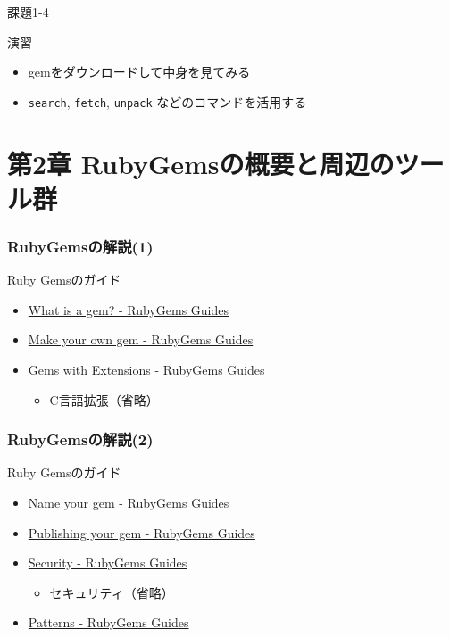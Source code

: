 \documentclass[t, aspectratio=169]{beamer}
\begin{document}
\begin{frame}[fragile,label=sec-1-5-4]{課題1-4}
 \begin{block}{演習}
\begin{itemize}
\item gemをダウンロードして中身を見てみる
\item \texttt{search}, \texttt{fetch},  \texttt{unpack} などのコマンドを活用する
\end{itemize}
\end{block}
\end{frame}

\part{第2章 RubyGemsの概要と周辺のツール群}
\label{sec-2}
\section{RubyGemsの解説(1)}
\label{sec-2-1}
\begin{frame}[label=sec-2-1-1]{Ruby Gemsのガイド}
\begin{itemize}
\item \href{http://guides.rubygems.org/what-is-a-gem/}{What is a gem? - RubyGems Guides}
\item \href{http://guides.rubygems.org/make-your-own-gem/}{Make your own gem - RubyGems Guides}
\item \href{http://guides.rubygems.org/gems-with-extensions/}{Gems with Extensions - RubyGems Guides}
\begin{itemize}
\item C言語拡張（省略）
\end{itemize}
\end{itemize}
\end{frame}

\section{RubyGemsの解説(2)}
\label{sec-2-2}
\begin{frame}[label=sec-2-2-1]{Ruby Gemsのガイド}
\begin{itemize}
\item \href{http://guides.rubygems.org/name-your-gem/}{Name your gem - RubyGems Guides}
\item \href{http://guides.rubygems.org/publishing/}{Publishing your gem - RubyGems Guides}
\item \href{http://guides.rubygems.org/security/}{Security - RubyGems Guides}
\begin{itemize}
\item セキュリティ（省略）
\end{itemize}
\item \href{http://guides.rubygems.org/patterns/}{Patterns - RubyGems Guides}
\end{itemize}
\end{frame}
\end{document}
